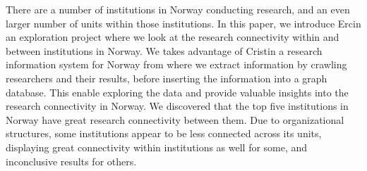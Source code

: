 There are a number of institutions in Norway conducting research, and an even larger number of units within those institutions.
In this paper, we introduce Ercin an exploration project where we look at the research connectivity within and between institutions in Norway. We takes advantage of Cristin\cite{CRISTIN-about} a research information system for Norway from where we extract information by crawling researchers and their results, before inserting the information into a graph database.
This enable exploring the data and provide valuable insights into the research connectivity in Norway.
We discovered that the top five institutions in Norway have great research connectivity between them.
Due to organizational structures, some institutions appear to be less connected across its units, displaying great connectivity within institutions as well for some, and inconclusive results for others.
